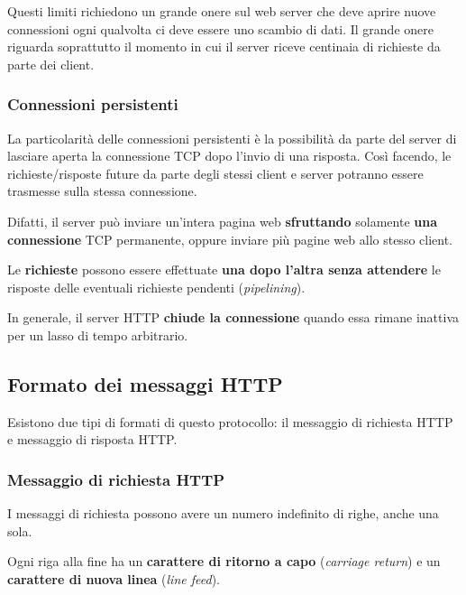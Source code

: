 \documentclass[a4paper]{article}
\begin{document}
	\noindent
	Questi limiti richiedono un grande onere sul web server che deve aprire nuove connessioni ogni qualvolta ci deve essere uno scambio di dati. Il grande onere riguarda soprattutto il momento in cui il server riceve centinaia di richieste da parte dei client.
	
	\newpage
	
	\subsubsection{Connessioni persistenti}
	
	La particolarità delle connessioni persistenti è la possibilità da parte del server di lasciare aperta la connessione TCP dopo l’invio di una risposta. Così facendo, le richieste/risposte future da parte degli stessi client e server potranno essere trasmesse sulla stessa connessione.\newline
	
	\noindent
	Difatti, il server può inviare un’intera pagina web \textbf{sfruttando} solamente \textbf{una connessione} TCP permanente, oppure inviare più pagine web allo stesso client.\newline
	
	\noindent
	Le \textbf{richieste} possono essere effettuate \textbf{una dopo l’altra senza attendere} le risposte delle eventuali richieste pendenti (\emph{pipelining}).\newline
	
	\noindent
	In generale, il server HTTP \textbf{chiude la connessione} quando essa rimane inattiva per un lasso di tempo arbitrario.
	
	\newpage
	
	\subsection{Formato dei messaggi HTTP}
	
	Esistono due tipi di formati di questo protocollo: il messaggio di richiesta HTTP e messaggio di risposta HTTP.
	
	\subsubsection{Messaggio di richiesta HTTP}
	
	I messaggi di richiesta possono avere un numero indefinito di righe, anche una sola.\newline
	
	\noindent
	Ogni riga alla fine ha un \textbf{carattere di ritorno a capo} (\emph{carriage return}) e un \textbf{carattere di nuova linea} (\emph{line feed}).\newline
	
\end{document}
